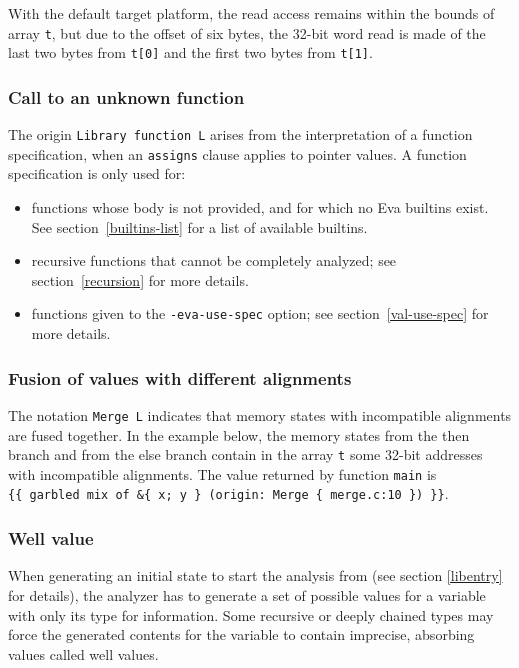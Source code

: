 \documentclass[web]{frama-c-book}
\begin{document}
With the default target platform, the read access remains 
within the bounds of array \lstinline|t|,
but due to the offset of six bytes,
the 32-bit word read is made of the last two bytes from \lstinline|t[0]|
and the first two bytes from \lstinline|t[1]|.

\subsubsection{Call to an unknown function}
The origin \lstinline$Library function L$ arises from the interpretation
of a function specification, when an \lstinline|assigns| clause applies to
pointer values.
A function specification is only used for:
\begin{itemize}
\item
  functions whose body is not provided, and for which no Eva builtins
  exist. See section~\ref{builtins-list} for a list of available builtins.
\item
  recursive functions that cannot be completely analyzed;
  see section~\ref{recursion} for more details.
\item
  functions given to the \verb+-eva-use-spec+ option;
  see section~\ref{val-use-spec} for more details.
\end{itemize}

\subsubsection{Fusion of values with different alignments}
The notation \lstinline$Merge L$ indicates that memory states with incompatible
alignments are fused together. In the example below,
the memory states from
the then branch and from the else branch contain in the array
\lstinline|t| some 32-bit addresses with incompatible alignments.
The value returned by function \lstinline|main| is\\
\lstinline|{{ garbled mix of &{ x; y } (origin: Merge { merge.c:10 }) }}|.

\subsubsection{Well value}

When generating an initial state to start the analysis from
(see section \ref{libentry} for details), the analyzer 
has to generate a set of
possible values for a variable with only its type for information.
Some recursive or deeply chained types may force the generated
contents for the variable to contain imprecise, absorbing values
called well values.
\end{document}

